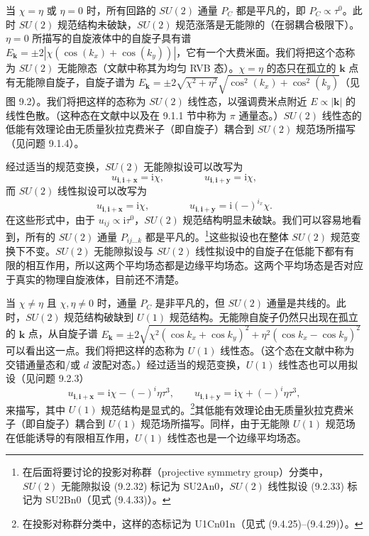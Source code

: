 当 $\chi=\eta$ 或 $\eta=0$ 时，所有回路的 $SU(2)$ 通量 $P_C$ 都是平凡的，即 $P_C\propto\tau^{0}$。此时 $SU(2)$ 规范结构未破缺，$SU(2)$ 规范涨落是无能隙的（在弱耦合极限下）。$\eta=0$ 所描写的自旋液体中的自旋子具有谱 $E_{\pmb{k}}=\pm 2|\chi(\cos(k_x)+\cos(k_y))|$，它有一个大费米面。我们将把这个态称为 $SU(2)$ 无能隙态（文献中称其为均匀 RVB 态）。$\chi=\eta$ 的态只在孤立的 $\pmb{k}$ 点有无能隙自旋子，自旋子谱为 $E_{\pmb{k}}=\pm 2\sqrt{\chi^{2}+\eta^{2}}\sqrt{\cos^{2}(k_x)+\cos^{2}(k_y)}$（见图 9.2）。我们将把这样的态称为 $SU(2)$ 线性态，以强调费米点附近 $E\propto|\pmb{k}|$ 的线性色散。（这种态在文献中以及在 9.1.1 节中称为 $\pi$ 通量态。）$SU(2)$ 线性态的低能有效理论由无质量狄拉克费米子（即自旋子）耦合到 $SU(2)$ 规范场所描写（见问题 9.1.4）。

经过适当的规范变换，$SU(2)$ 无能隙拟设可以改写为
\begin{equation*}
u_{\pmb{i},\pmb{i}+\pmb{x}}=\mathrm{i}\chi,\qquad\qquad u_{\pmb{i},\pmb{i}+\pmb{y}}=\mathrm{i}\chi,
\tag{9.2.32}
\end{equation*}
而 $SU(2)$ 线性拟设可以改写为
\begin{equation*}
u_{\pmb{i},\pmb{i}+\pmb{x}}=\mathrm{i}\chi,\qquad\qquad u_{\pmb{i},\pmb{i}+\pmb{y}}=\mathrm{i}(-)^{i_x}\chi.
\tag{9.2.33}
\end{equation*}
在这些形式中，由于 $u_{ij}\propto\mathrm{i}\tau^{0}$，$SU(2)$ 规范结构明显未破缺。我们可以容易地看到，所有的 $SU(2)$ 通量 $P_{ij\dots k}$ 都是平凡的。\footnote{在后面将要讨论的投影对称群（projective symmetry group）分类中，$SU(2)$ 无能隙拟设 (9.2.32) 标记为 SU2An0，$SU(2)$ 线性拟设 (9.2.33) 标记为 SU2Bn0（见式 (9.4.33)）。}这些拟设也在整体 $SU(2)$ 规范变换下不变。$SU(2)$ 无能隙拟设与 $SU(2)$ 线性拟设中的自旋子在低能下都有有限的相互作用，所以这两个平均场态都是边缘平均场态。这两个平均场态是否对应于真实的物理自旋液体，目前还不清楚。

当 $\chi\neq\eta$ 且 $\chi,\eta\neq 0$ 时，通量 $P_C$ 是非平凡的，但 $SU(2)$ 通量是共线的。此时，$SU(2)$ 规范结构破缺到 $U(1)$ 规范结构。无能隙自旋子仍然只出现在孤立的 $\pmb{k}$ 点，从自旋子谱 $E_{\pmb{k}}=\pm 2\sqrt{\chi^{2}(\cos k_x+\cos k_y)^{2}+\eta^{2}(\cos k_x-\cos k_y)^{2}}$ 可以看出这一点。我们将把这样的态称为 $U(1)$ 线性态。（这个态在文献中称为交错通量态和/或 $d$ 波配对态。）经过适当的规范变换，$U(1)$ 线性态也可以用拟设（见问题 9.2.3）
\begin{equation*}
u_{\pmb{i},\pmb{i}+\pmb{x}}=\mathrm{i}\chi-(-)^{i}\eta\tau^{3},\qquad u_{\pmb{i},\pmb{i}+\pmb{y}}=\mathrm{i}\chi+(-)^{i}\eta\tau^{3},
\tag{9.2.34}
\end{equation*}
来描写，其中 $U(1)$ 规范结构是显式的。\footnote{在投影对称群分类中，这样的态标记为 U1Cn01n（见式 (9.4.25)--(9.4.29)）。}其低能有效理论由无质量狄拉克费米子（即自旋子）耦合到 $U(1)$ 规范场所描写。同样，由于无能隙 $U(1)$ 规范场在低能诱导的有限相互作用，$U(1)$ 线性态也是一个边缘平均场态。


